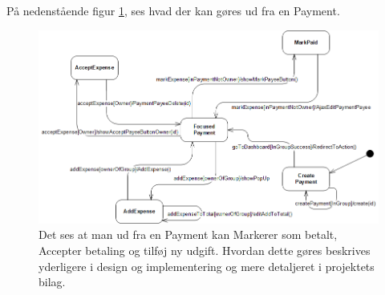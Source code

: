 \noindent På nedenstående figur \ref{fig:paymentFunctionality}, ses hvad der kan gøres ud fra en Payment.

\begin{figure}[H]
    \centering
    \includegraphics[width=\linewidth]{09_Arkitektur/Payment/Images/Payment_STM.png}
    \caption{Det ses at man ud fra en Payment kan Markerer som betalt, Accepter betaling og tilføj ny udgift. Hvordan dette gøres beskrives yderligere i design og implementering og mere detaljeret i projektets bilag.}
    \label{fig:paymentFunctionality}
\end{figure}

